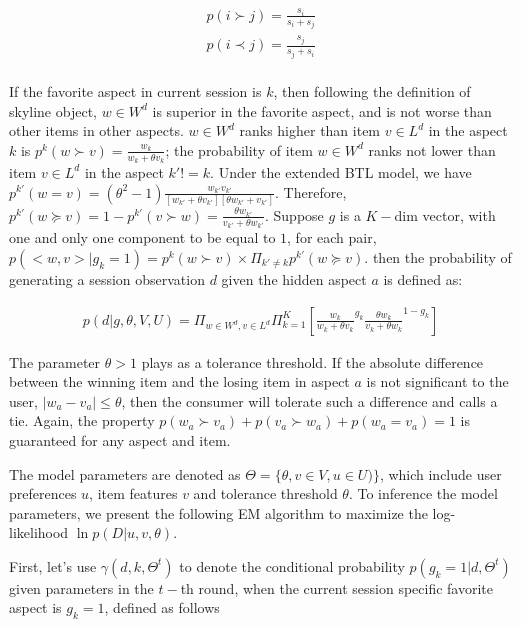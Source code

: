 \documentclass[sigconf]{acmart}
\begin{document}
\begin{align*}
	p(i \succ j)=\frac{s_i}{s_i+ s_j} \\
	p(i \prec j)=\frac{s_j}{s_j+ s_i} \\
\end{align*}
  
If the favorite aspect in current session is $k$, then following the definition of skyline object, $w\in W^d$ is superior in the favorite aspect,  and is not worse than other items in other aspects. $w\in W^d$ ranks higher than item $v\in L^d$ in the aspect $k$ is $p^k(w \succ v)=\frac{w_k}{w_k+\theta v_k}$; the probability of item $w\in W^d$ ranks not lower than item $v\in L^d$ in the aspect $k'!=k$. Under the extended BTL model, we have$p^{k'}(w = v)=(\theta^2-1)\frac{w_{k'}v_{k'}}{[w_{k'}+\theta v_{k'}][\theta w_{k'}+ v_{k'}]}$. Therefore, $p^{k'}(w \succeq v)=1- p^{k'} (v \succ w) = \frac{\theta w_{k'}}{v_{k'}+\theta w_{k'}}$. Suppose $g$ is a $K-$dim vector, with one and only one component to be equal to $1$, for each pair, $p(<w,v>|g_k=1) = p^k(w\succ v) \times \Pi_{k'\neq k} p^{k'}(w \succeq v)$. then the probability of generating a session observation $d$ given the hidden aspect $a$ is defined as:  

\begin{align}\label{equ:skyline}
		p(d|g,\theta,V,U) %
		=\Pi_{w\in W^d, v\in L^d} \Pi_{k=1}^{K}[ {\frac{w_k}{w_k+\theta v_k}}^{g_k} { \frac{\theta w_{k}}{v_{k}+\theta w_{k}}}^{1-g_k}]
\end{align}

The parameter $\theta>1$ plays as a tolerance threshold. If the absolute difference between the winning item and the losing item in aspect $a$ is not significant to the user, $|w_a-v_a|\leq \theta$, then the consumer will tolerate such a difference and calls a tie. Again, the property $p(w_a \succ v_a) + p(v_a \succ w_a) + p( w_a = v_a) =1$ is guaranteed for any aspect and item.
 



The model parameters are denoted as $\Theta=\{\theta,v\in V, u\in U)\}$, which include user preferences $u$, item features $v$ and tolerance threshold $\theta$. To inference the model parameters, we present the following EM algorithm to maximize the log-likelihood $\ln p(D|u,v,\theta)$. 

First, let's use $\gamma(d,k,\Theta^t)$ to denote the conditional probability $p(g_k=1|d,\Theta^t)$ given parameters in the $t-$th round, when the current session specific favorite aspect is $g_k=1$, defined as follows
\end{document}
